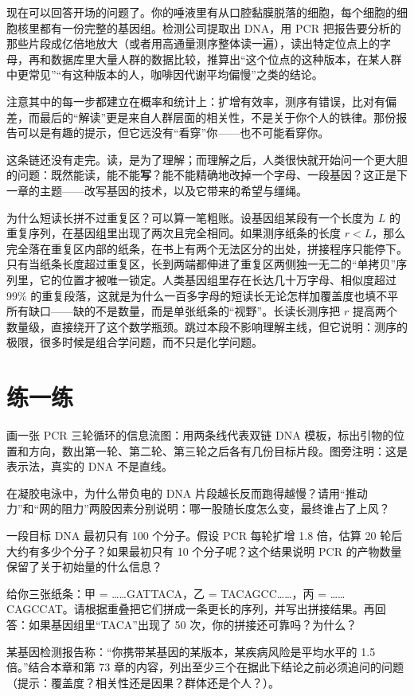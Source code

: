 现在可以回答开场的问题了。你的唾液里有从口腔黏膜脱落的细胞，每个细胞的细胞核里都有一份完整的基因组。检测公司提取出 DNA，用 PCR 把报告要分析的那些片段成亿倍地放大（或者用高通量测序整体读一遍），读出特定位点上的字母，再和数据库里大量人群的数据比较，推算出“这个位点的这种版本，在某人群中更常见”“有这种版本的人，咖啡因代谢平均偏慢”之类的结论。

注意其中的每一步都建立在概率和统计上：扩增有效率，测序有错误，比对有偏差，而最后的“解读”更是来自人群层面的相关性，不是关于你个人的铁律。那份报告可以是有趣的提示，但它远没有“看穿”你——也不可能看穿你。

这条链还没有走完。读，是为了理解；而理解之后，人类很快就开始问一个更大胆的问题：既然能读，能不能\textbf{写}？能不能精确地改掉一个字母、一段基因？这正是下一章的主题——改写基因的技术，以及它带来的希望与缰绳。

\begin{tiaozhan}
为什么短读长拼不过重复区？可以算一笔粗账。设基因组某段有一个长度为 $L$ 的重复序列，在基因组里出现了两次且完全相同。如果测序纸条的长度 $r<L$，那么完全落在重复区内部的纸条，在书上有两个无法区分的出处，拼接程序只能停下。只有当纸条长度超过重复区，长到两端都伸进了重复区两侧独一无二的“单拷贝”序列里，它的位置才被唯一锁定。人类基因组里存在长达几十万字母、相似度超过 $99\%$ 的重复段落，这就是为什么一百多字母的短读长无论怎样加覆盖度也填不平所有缺口——缺的不是数量，而是单张纸条的“视野”。长读长测序把 $r$ 提高两个数量级，直接绕开了这个数学瓶颈。跳过本段不影响理解主线，但它说明：测序的极限，很多时候是组合学问题，而不只是化学问题。
\end{tiaozhan}

\section*{练一练}

\begin{sikaoti}
\item 画一张 PCR 三轮循环的信息流图：用两条线代表双链 DNA 模板，标出引物的位置和方向，数出第一轮、第二轮、第三轮之后各有几份目标片段。图旁注明：这是表示法，真实的 DNA 不是直线。
\item 在凝胶电泳中，为什么带负电的 DNA 片段越长反而跑得越慢？请用“推动力”和“网的阻力”两股因素分别说明：哪一股随长度怎么变，最终谁占了上风？
\item 一段目标 DNA 最初只有 100 个分子。假设 PCR 每轮扩增 1.8 倍，估算 20 轮后大约有多少个分子？如果最初只有 10 个分子呢？这个结果说明 PCR 的产物数量保留了关于初始量的什么信息？
\item 给你三张纸条：甲 = ……GATTACA，乙 = TACAGCC……，丙 = ……CAGCCAT。请根据重叠把它们拼成一条更长的序列，并写出拼接结果。再回答：如果基因组里“TACA”出现了 50 次，你的拼接还可靠吗？为什么？
\item 某基因检测报告称：“你携带某基因的某版本，某疾病风险是平均水平的 1.5 倍。”结合本章和第 73 章的内容，列出至少三个在据此下结论之前必须追问的问题（提示：覆盖度？相关性还是因果？群体还是个人？）。
\end{sikaoti}
